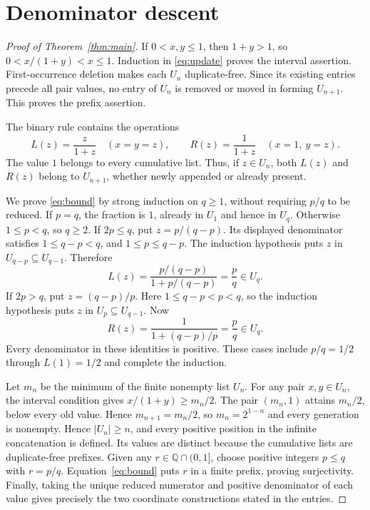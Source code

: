 \documentclass[11pt]{article}
\newcommand{\Q}{\mathbb{Q}}
\begin{document}
\section{Denominator descent}
\begin{proof}[Proof of Theorem~\ref{thm:main}]
If $0<x,y\le1$, then $1+y>1$, so
$0<x/(1+y)<x\le1$. Induction in \eqref{eq:update} proves the interval
assertion. First-occurrence deletion makes each $U_n$ duplicate-free.
Since its existing entries precede all pair values, no entry of $U_n$
is removed or moved in forming $U_{n+1}$. This proves the prefix assertion.

The binary rule contains the operations
\begin{equation}\label{eq:unary}
 L(z)=\frac{z}{1+z}\quad(x=y=z),\qquad
 R(z)=\frac{1}{1+z}\quad(x=1,\ y=z).
\end{equation}
The value $1$ belongs to every cumulative list. Thus, if $z\in U_n$,
both $L(z)$ and $R(z)$ belong to $U_{n+1}$, whether newly appended or
already present.

We prove \eqref{eq:bound} by strong induction on $q\ge1$, without
requiring $p/q$ to be reduced. If $p=q$, the fraction is $1$, already
in $U_1$ and hence in $U_q$. Otherwise $1\le p<q$, so $q\ge2$.
If $2p\le q$, put $z=p/(q-p)$. Its displayed denominator satisfies
$1\le q-p<q$, and $1\le p\le q-p$. The induction hypothesis puts
$z$ in $U_{q-p}\subseteq U_{q-1}$. Therefore
\[
 L(z)=\frac{p/(q-p)}{1+p/(q-p)}=\frac pq\in U_q.
\]
If $2p>q$, put $z=(q-p)/p$. Here $1\le q-p<p<q$, so the induction
hypothesis puts $z$ in $U_p\subseteq U_{q-1}$. Now
\[
 R(z)=\frac{1}{1+(q-p)/p}=\frac pq\in U_q.
\]
Every denominator in these identities is positive. These cases include
$p/q=1/2$ through $L(1)=1/2$ and complete the induction.

Let $m_n$ be the minimum of the finite nonempty list $U_n$.
For any pair $x,y\in U_n$, the interval condition gives
$x/(1+y)\ge m_n/2$. The pair $(m_n,1)$ attains $m_n/2$, below every
old value. Hence $m_{n+1}=m_n/2$, so $m_n=2^{1-n}$ and every generation
is nonempty.
Hence $|U_n|\ge n$, and every positive position in the infinite
concatenation is defined. Its values are distinct because the cumulative
lists are duplicate-free prefixes. Given any $r\in\Q\cap(0,1]$, choose
positive integers $p\le q$ with $r=p/q$. Equation~\eqref{eq:bound} puts
$r$ in a finite prefix, proving surjectivity. Finally, taking the unique
reduced numerator and positive denominator of each value gives precisely
the two coordinate constructions stated in the entries.
\end{proof}
\end{document}
